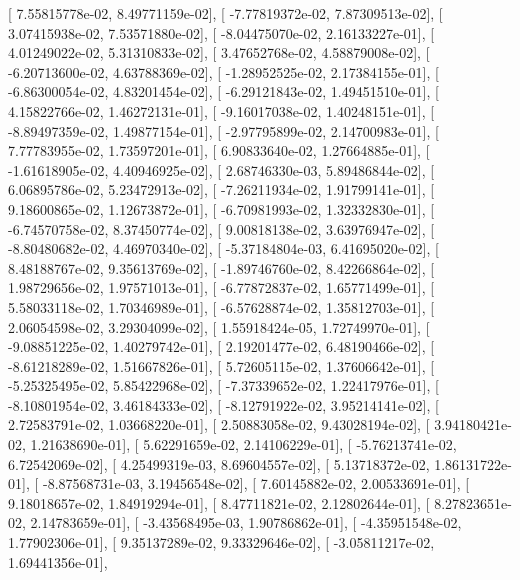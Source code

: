 \documentclass{article}
\begin{document}
       [  7.55815778e-02,   8.49771159e-02],
       [ -7.77819372e-02,   7.87309513e-02],
       [  3.07415938e-02,   7.53571880e-02],
       [ -8.04475070e-02,   2.16133227e-01],
       [  4.01249022e-02,   5.31310833e-02],
       [  3.47652768e-02,   4.58879008e-02],
       [ -6.20713600e-02,   4.63788369e-02],
       [ -1.28952525e-02,   2.17384155e-01],
       [ -6.86300054e-02,   4.83201454e-02],
       [ -6.29121843e-02,   1.49451510e-01],
       [  4.15822766e-02,   1.46272131e-01],
       [ -9.16017038e-02,   1.40248151e-01],
       [ -8.89497359e-02,   1.49877154e-01],
       [ -2.97795899e-02,   2.14700983e-01],
       [  7.77783955e-02,   1.73597201e-01],
       [  6.90833640e-02,   1.27664885e-01],
       [ -1.61618905e-02,   4.40946925e-02],
       [  2.68746330e-03,   5.89486844e-02],
       [  6.06895786e-02,   5.23472913e-02],
       [ -7.26211934e-02,   1.91799141e-01],
       [  9.18600865e-02,   1.12673872e-01],
       [ -6.70981993e-02,   1.32332830e-01],
       [ -6.74570758e-02,   8.37450774e-02],
       [  9.00818138e-02,   3.63976947e-02],
       [ -8.80480682e-02,   4.46970340e-02],
       [ -5.37184804e-03,   6.41695020e-02],
       [  8.48188767e-02,   9.35613769e-02],
       [ -1.89746760e-02,   8.42266864e-02],
       [  1.98729656e-02,   1.97571013e-01],
       [ -6.77872837e-02,   1.65771499e-01],
       [  5.58033118e-02,   1.70346989e-01],
       [ -6.57628874e-02,   1.35812703e-01],
       [  2.06054598e-02,   3.29304099e-02],
       [  1.55918424e-05,   1.72749970e-01],
       [ -9.08851225e-02,   1.40279742e-01],
       [  2.19201477e-02,   6.48190466e-02],
       [ -8.61218289e-02,   1.51667826e-01],
       [  5.72605115e-02,   1.37606642e-01],
       [ -5.25325495e-02,   5.85422968e-02],
       [ -7.37339652e-02,   1.22417976e-01],
       [ -8.10801954e-02,   3.46184333e-02],
       [ -8.12791922e-02,   3.95214141e-02],
       [  2.72583791e-02,   1.03668220e-01],
       [  2.50883058e-02,   9.43028194e-02],
       [  3.94180421e-02,   1.21638690e-01],
       [  5.62291659e-02,   2.14106229e-01],
       [ -5.76213741e-02,   6.72542069e-02],
       [  4.25499319e-03,   8.69604557e-02],
       [  5.13718372e-02,   1.86131722e-01],
       [ -8.87568731e-03,   3.19456548e-02],
       [  7.60145882e-02,   2.00533691e-01],
       [  9.18018657e-02,   1.84919294e-01],
       [  8.47711821e-02,   2.12802644e-01],
       [  8.27823651e-02,   2.14783659e-01],
       [ -3.43568495e-03,   1.90786862e-01],
       [ -4.35951548e-02,   1.77902306e-01],
       [  9.35137289e-02,   9.33329646e-02],
       [ -3.05811217e-02,   1.69441356e-01],
\end{document}
